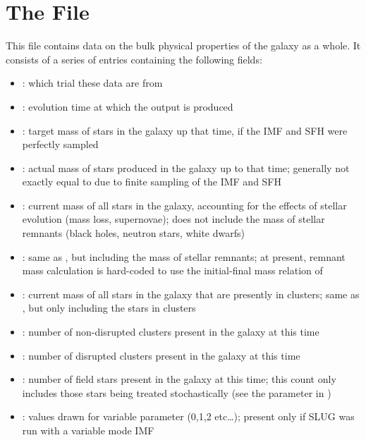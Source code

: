 \documentclass[letterpaper,10pt,english]{sphinxmanual}
\begin{document}
\section{The  File}
\label{\detokenize{output:the-integrated-prop-file}}
This file contains data on the bulk physical properties of the galaxy as a whole. It consists of a series of entries containing the following fields:
\begin{itemize}
\item {} 
: which trial these data are from

\item {} 
: evolution time at which the output is produced

\item {} 
: target mass of stars in the galaxy up that time, if the IMF and SFH were perfectly sampled

\item {} 
: actual mass of stars produced in the galaxy up to that time; generally not exactly equal to  due to finite sampling of the IMF and SFH

\item {} 
:  current mass of all stars in the galaxy, accounting for the effects of stellar evolution (mass loss, supernovae); does not include the mass of stellar remnants (black holes, neutron stars, white dwarfs)

\item {} 
: same as , but including the mass of stellar remnants; at present, remnant mass calculation is hard-coded to use the initial-final mass relation of 

\item {} 
: current mass of all stars in the galaxy that are presently in clusters; same as , but only including the stars in clusters

\item {} 
: number of non-disrupted clusters present in the galaxy at this time

\item {} 
: number of disrupted clusters present in the galaxy at this time

\item {} 
: number of field stars present in the galaxy at this time; this count only includes those stars being treated stochastically (see the parameter  in {\hyperref[\detokenize{parameters:ssec-stellar-keywords}]{}})

\item {} 
: values drawn for variable parameter  (0,1,2 etc…); present only if SLUG was run with a variable mode IMF

\end{itemize}
\end{document}
